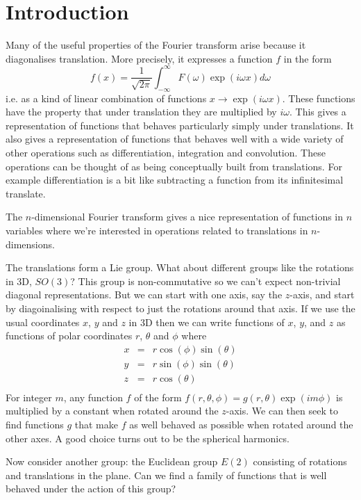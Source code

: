 \documentclass{article}
\begin{document}
\section{Introduction}
Many of the useful properties of the Fourier transform arise because it diagonalises translation.
More precisely, it expresses a function $f$ in the form
\[
f(x) = \frac{1}{\sqrt{2\pi}}\int_{-\infty}^\infty F(\omega)\exp(i\omega x)d\omega
\]
i.e. as a kind of linear combination of functions $x\rightarrow\exp(i\omega x)$.
These functions have the property that under translation they are multiplied by $i\omega$.
This gives a representation of functions that behaves particularly simply under translations.
It also gives a representation of functions that behaves well with a wide variety of other operations such as differentiation, integration and convolution.
These operations can be thought of as being conceptually built from translations.
For example differentiation is a bit like subtracting a function from its infinitesimal translate.

The $n$-dimensional Fourier transform gives a nice representation of functions in $n$ variables where we're interested in operations related to translations in $n$-dimensions.

The translations form a Lie group.
What about different groups like the rotations in 3D, $SO(3)$?
This group is non-commutative so we can't expect non-trivial diagonal representations.
But we can start with one axis, say the $z$-axis, and start by diagoinalising with respect to just the rotations around that axis.
If we use the usual coordinates $x$, $y$ and $z$ in 3D then we can write functions of $x$, $y$, and $z$ as functions of polar coordinates $r$, $\theta$ and $\phi$ where
\begin{align*}
x & = & r\cos(\phi)\sin(\theta) \\
y & = & r\sin(\phi)\sin(\theta) \\
z & = & r\cos(\theta) \\
\end{align*}
For integer $m$, any function $f$ of the form $f(r,\theta,\phi) = g(r,\theta)\exp(im\phi)$ is multiplied by a constant when rotated around the $z$-axis.
We can then seek to find functions $g$ that make $f$ as well behaved as possible when rotated around the other axes.
A good choice turns out to be the spherical harmonics.

Now consider another group: the Euclidean group $E(2)$ consisting of rotations and translations in the plane.
Can we find a family of functions that is well behaved under the action of this group?
\end{document}
